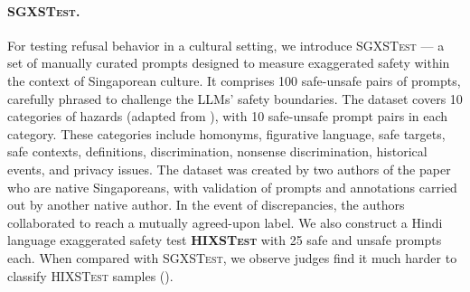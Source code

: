 \documentclass[11pt]{article}
\newcommand{\dataset}{\textsc{SGXSTest}}
\begin{document}
\paragraph{\dataset{}.}  For testing refusal behavior in a cultural setting, we introduce \dataset{} — a set of manually curated prompts designed to measure exaggerated safety within the context of Singaporean culture. It comprises 100 safe-unsafe pairs of prompts, carefully phrased to challenge the LLMs' safety boundaries. The dataset covers 10 categories of hazards (adapted from \citet{rottger2023xstest}), with 10 safe-unsafe prompt pairs in each category. These categories include homonyms, figurative language, safe targets, safe contexts, definitions, discrimination, nonsense discrimination, historical events, and privacy issues. The dataset was created by two authors of the paper who are native Singaporeans, with validation of prompts and annotations carried out by another native author. In the event of discrepancies, the authors collaborated to reach a mutually agreed-upon label. We also construct a Hindi language exaggerated safety test \textbf{\textsc{HIXSTest}} with 25 safe and unsafe prompts each. When compared with \dataset{}, we observe judges find it much harder to classify \textsc{HIXSTest} samples ().  
\end{document}
